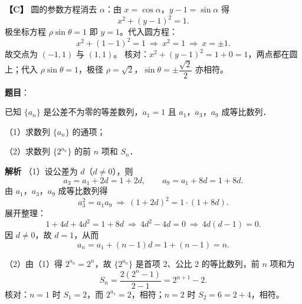 \begin{answer}
\textbf{【C】} 圆的参数方程消去 $\alpha$：由 $x=\cos\alpha$，$y-1=\sin\alpha$ 得
\nopagebreak[4]
\[x^2+(y-1)^2=1.\]
极坐标方程 $\rho\sin\theta=1$ 即 $y=1$。代入圆方程：
\nopagebreak[4]
\[x^2+(1-1)^2=1\ \Longrightarrow\ x^2=1\ \Longrightarrow\ x=\pm 1.\]
故交点为 $(-1,1)$ 与 $(1,1)$。
核对：$x^2+(y-1)^2=1+0=1$，两点都在圆上；代入 $\rho\sin\theta=1$，极径 $\rho=\sqrt2$，$\sin\theta=\pm\dfrac{\sqrt2}{2}$ 亦相符。

\gkanswer{答案：【A】$[1,+\infty)$；【B】$\dfrac{16}{9}$；【C】$(-1,1)$，$(1,1)$。}

\end{answer}
\begin{answer}

\textbf{题目}：

已知 $\{a_n\}$ 是公差不为零的等差数列，$a_1=1$ 且 $a_1$，$a_3$，$a_9$ 成等比数列．

（1）求数列 $\{a_n\}$ 的通项；

（2）求数列 $\{2^{a_n}\}$ 的前 $n$ 项和 $S_n$．

\textbf{解析}
（1）设公差为 $d$（$d\neq 0$），则
\nopagebreak[4]
\[a_3=a_1+2d=1+2d,\qquad a_9=a_1+8d=1+8d.\]
由 $a_1$，$a_3$，$a_9$ 成等比数列得
\nopagebreak[4]
\[a_3^2=a_1a_9\ \Longrightarrow\ (1+2d)^2=1\cdot(1+8d).\]
展开整理：
\nopagebreak[4]
\[1+4d+4d^2=1+8d\ \Longrightarrow\ 4d^2-4d=0\ \Longrightarrow\ 4d(d-1)=0.\]
因 $d\neq 0$，故 $d=1$，从而
\nopagebreak[4]
\[a_n=a_1+(n-1)d=1+(n-1)=n.\]

（2）由（1）得 $2^{a_n}=2^n$，故 $\{2^{a_n}\}$ 是首项 $2$、公比 $2$ 的等比数列，前 $n$ 项和为
\nopagebreak[4]
\[S_n=\frac{2(2^n-1)}{2-1}=2^{n+1}-2.\]
核对：$n=1$ 时 $S_1=2$，而 $2^{a_1}=2$，相符；$n=2$ 时 $S_2=6=2+4$，相符。


\end{answer}
